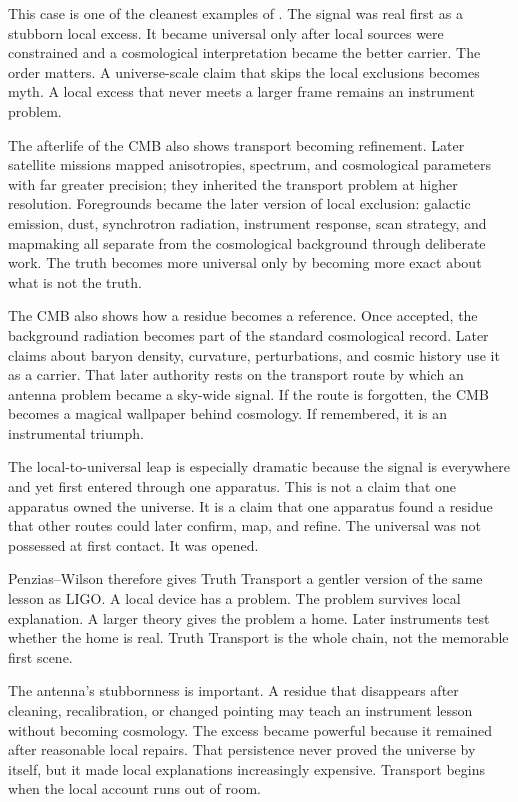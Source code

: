 This case is one of the cleanest examples of .
The signal was real first as a stubborn local excess. It became universal
only after local sources were constrained and a cosmological
interpretation became the better carrier. The order matters. A
universe-scale claim that skips the local exclusions becomes myth. A local
excess that never meets a larger frame remains an instrument problem.

The afterlife of the CMB also shows transport becoming refinement. Later
satellite missions mapped anisotropies, spectrum, and cosmological
parameters with far greater precision; they inherited the transport
problem at higher resolution. Foregrounds became the later version of
local exclusion: galactic emission, dust, synchrotron radiation,
instrument response, scan strategy, and mapmaking all separate from the
cosmological background through deliberate work. The truth becomes more
universal only by becoming more exact about what is not the truth.

The CMB also shows how a residue becomes a reference. Once accepted, the
background radiation becomes part of the standard cosmological record.
Later claims about baryon density, curvature, perturbations, and cosmic
history use it as a carrier. That later authority rests on the transport
route by which an antenna problem became a sky-wide signal. If the route
is forgotten, the CMB becomes a magical wallpaper behind cosmology. If
remembered, it is an instrumental triumph.

The local-to-universal leap is especially dramatic because the signal is
everywhere and yet first entered through one apparatus. This is not a
claim that one apparatus owned the universe. It is a claim that one
apparatus found a residue that other routes could later confirm, map, and
refine. The universal was not possessed at first contact. It was opened.

Penzias--Wilson therefore gives Truth Transport a gentler version of the
same lesson as LIGO. A local device has a problem. The problem survives
local explanation. A larger theory gives the problem a home. Later
instruments test whether the home is real. Truth Transport is the whole
chain, not the memorable first scene.

The antenna's stubbornness is important. A residue that disappears after
cleaning, recalibration, or changed pointing may teach an instrument
lesson without becoming cosmology. The excess became powerful because it
remained after reasonable local repairs. That persistence never proved
the universe by itself, but it made local explanations increasingly
expensive. Transport begins when the local account runs out of room.


